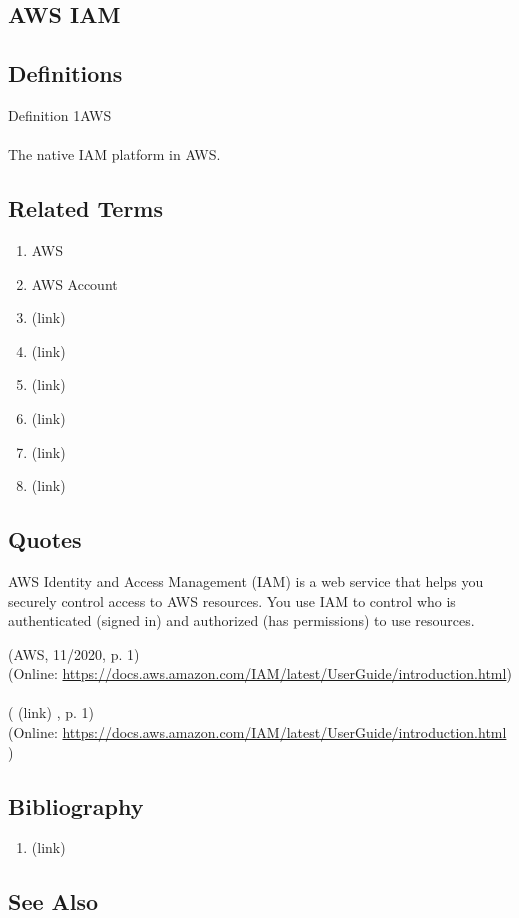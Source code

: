 \newpage \subsection*{AWS IAM } \subsection*{Definitions } \begin{DIC_Def}{Definition 1AWS }{} \paragraph{} The native IAM platform in AWS.  \end{DIC_Def} \subsection*{Related Terms } \begin{enumerate} \item  AWS  \item  AWS Account  \item  (link) \href{AWS Account Root User (Dictionary Entry) }{ }   \item  (link) \href{AWS IAM Group (Dictionary Entry) }{ }   \item  (link) \href{AWS IAM Policy (Dictionary Entry) }{ }   \item  (link) \href{AWS IAM Role (Dictionary Entry) }{ }   \item  (link) \href{AWS IAM Temporary Security Credentials (Dictionary Entry) }{ }   \item  (link) \href{AWS IAM User (Dictionary Entry) }{ }   \end{enumerate} \subsection*{Quotes } \begin{DIC_BlockQuote} AWS Identity and Access Management (IAM) is a web service that helps you securely control access to AWS resources. You use IAM to control who is authenticated (signed in) and authorized (has permissions) to use resources.  \end{DIC_BlockQuote} (AWS, 11/2020, p. 1)\\ (Online: \url{https://docs.aws.amazon.com/IAM/latest/UserGuide/introduction.html})  \paragraph{} (  (link) \href{AWS, 11/2020 }{ } , p. 1)  \\  (Online:  \href{None }{https://docs.aws.amazon.com/IAM/latest/UserGuide/introduction.html } )  \subsection*{Bibliography } \begin{enumerate} \item  (link) \href{AWS, 11/2020 }{ }   \end{enumerate} \subsection*{See Also } 